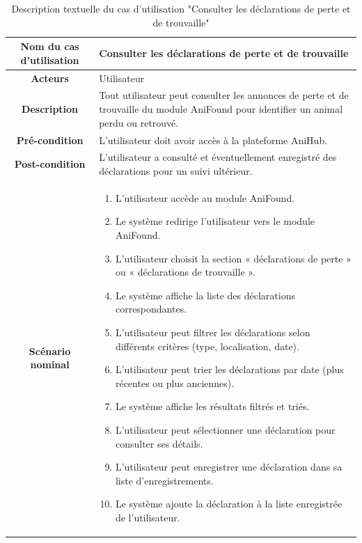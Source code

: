 \begin{longtable}{|c|p{11cm}|}
\caption{Description textuelle du cas d’utilisation "Consulter les déclarations de perte et de trouvaille"}
\label{tab:consulter_declarations} \\
\hline
\cellcolor{coloranifound} \textbf{Nom du cas d'utilisation } & Consulter les déclarations de perte et de trouvaille \\
\hline
\cellcolor{coloranifound} \textbf{Acteurs} & Utilisateur \\
\hline
\cellcolor{coloranifound} \textbf{Description } & Tout utilisateur peut consulter les annonces de perte et de trouvaille du module AniFound pour identifier un animal perdu ou retrouvé. \\
\hline
\cellcolor{coloranifound} \textbf{Pré-condition } & L’utilisateur doit avoir accès à la plateforme AniHub. \\
\hline
\cellcolor{coloranifound} \textbf{Post-condition } & L’utilisateur a consulté et éventuellement enregistré des déclarations pour un suivi ultérieur. \\
\hline
\cellcolor{coloranifound} \textbf{Scénario nominal } & 
\begin{enumerate}
\item L’utilisateur accède au module AniFound.
\item Le système redirige l’utilisateur vers le module AniFound.
\item L’utilisateur choisit la section « déclarations de perte » ou « déclarations de trouvaille ».
\item Le système affiche la liste des déclarations correspondantes.
\item L’utilisateur peut filtrer les déclarations selon différents critères (type, localisation, date).
\item L’utilisateur peut trier les déclarations par date (plus récentes ou plus anciennes).
\item Le système affiche les résultats filtrés et triés.
\item L’utilisateur peut sélectionner une déclaration pour consulter ses détails.
\item L’utilisateur peut enregistrer une déclaration dans sa liste d'enregistrements.
\item Le système ajoute la déclaration à la liste enregistrée de l’utilisateur.
\end{enumerate} \\
\hline
\end{longtable}
\newpage 
